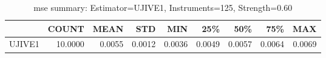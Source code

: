 \begin{table}[ht]
\centering
\caption{mse summary: Estimator=UJIVE1, Instruments=125, Strength=0.60}
\begin{tabular}{lrrrrrrrr}
\toprule
 & COUNT & MEAN & STD & MIN & 25\% & 50\% & 75\% & MAX \\
\midrule
UJIVE1 & 10.0000 & 0.0055 & 0.0012 & 0.0036 & 0.0049 & 0.0057 & 0.0064 & 0.0069 \\
\bottomrule
\end{tabular}
\end{table}
